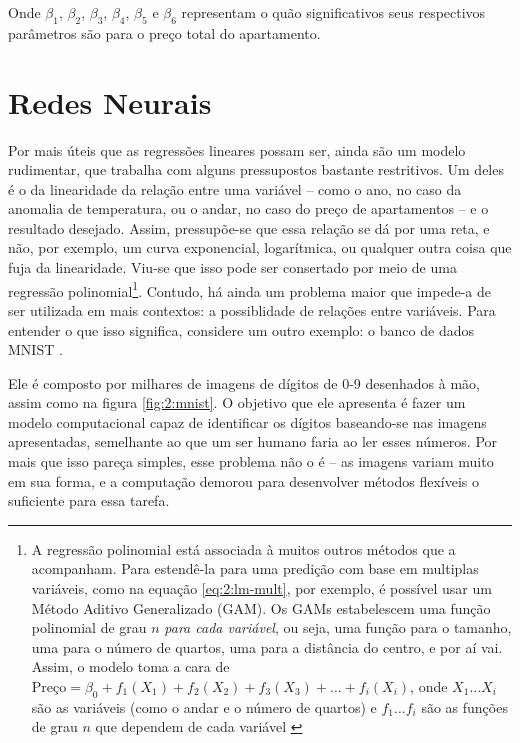 Onde $\beta_1$, $\beta_2$, $\beta_3$, $\beta_4$, $\beta_5$ e $\beta_6$ representam o quão significativos seus respectivos parâmetros são para o preço total do apartamento.

\section{Redes Neurais}\label{sec:2:redes-neurais}
Por mais úteis que as regressões lineares possam ser, ainda são um modelo rudimentar, que trabalha com alguns pressupostos bastante restritivos.
Um deles é o da linearidade da relação entre uma variável -- como o ano, no caso da anomalia de temperatura, ou o andar, no caso do preço de apartamentos -- e o resultado desejado.
Assim, pressupõe-se que essa relação se dá por uma reta, e não, por exemplo, um curva exponencial, logarítmica, ou qualquer outra coisa que fuja da linearidade.
Viu-se que isso pode ser consertado por meio de uma regressão polinomial\footnote{A regressão polinomial está associada à muitos outros métodos que a acompanham. Para estendê-la para uma predição com base em multiplas variáveis, como na equação \ref{eq:2:lm-mult}, por exemplo, é possível usar um Método Aditivo Generalizado (GAM). Os GAMs estabelescem uma função polinomial de grau $n$ \textit{para cada variável}, ou seja, uma função para o tamanho, uma para o número de quartos, uma para a distância do centro, e por aí vai. Assim, o modelo toma a cara de $\text{Preço} = \beta_0 + f_1(X_1) + f_2(X_2) + f_3(X_3) + \dots + f_i(X_i)$, onde $X_1\dots X_i$ são as variáveis (como o andar e o número de quartos) e $f_1\dots f_i$ são as funções de grau $n$ que dependem de cada variável \cite{james_introduction_2021a}}.
Contudo, há ainda um problema maior que impede-a de ser utilizada em mais contextos: a possiblidade de relações entre variáveis.
Para entender o que isso significa, considere um outro exemplo: o banco de dados MNIST \cite{lecun_mnist_}.

Ele é composto por milhares de imagens de dígitos de 0-9 desenhados à mão, assim como na figura \ref{fig:2:mnist}.
O objetivo que ele apresenta é fazer um modelo computacional capaz de identificar os dígitos baseando-se nas imagens apresentadas, semelhante ao que um ser humano faria ao ler esses números.
Por mais que isso pareça simples, esse problema não o é -- as imagens variam muito em sua forma, e a computação demorou para desenvolver métodos flexíveis o suficiente para essa tarefa.

